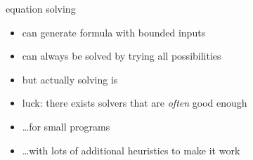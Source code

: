 
\begin{frame}{equation solving}
    \begin{itemize}
        \item can generate formula with bounded inputs
        \item can always be solved by trying all possibilities
            \vspace{.5cm}
        \item but actually solving is 
        \item luck: there exists solvers that are \textit{often} good enough
        \item \ldots for small programs
        \item \ldots with lots of additional heuristics to make it work
    \end{itemize}
\end{frame}
